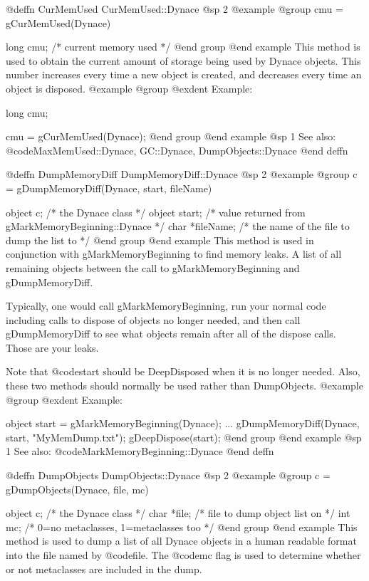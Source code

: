 @deffn {CurMemUsed} CurMemUsed::Dynace
@sp 2
@example
@group
cmu = gCurMemUsed(Dynace)

long    cmu;    /*  current memory used  */
@end group
@end example
This method is used to obtain the current amount of storage being used
by Dynace objects.  This number increases every time a new object is
created, and decreases every time an object is disposed.
@example
@group
@exdent Example:

long    cmu;

cmu = gCurMemUsed(Dynace);
@end group
@end example
@sp 1
See also:  @code{MaxMemUsed::Dynace, GC::Dynace, DumpObjects::Dynace}
@end deffn










@deffn {DumpMemoryDiff} DumpMemoryDiff::Dynace
@sp 2
@example
@group
c = gDumpMemoryDiff(Dynace, start, fileName)

object  c;       /*  the Dynace class  */
object start;    /*  value returned from gMarkMemoryBeginning::Dynace  */
char *fileName;  /*  the name of the file to dump the list to   */
@end group
@end example
This method is used in conjunction with gMarkMemoryBeginning to find
memory leaks.  A list of all remaining objects between the call
to gMarkMemoryBeginning and gDumpMemoryDiff.

Typically, one would call gMarkMemoryBeginning, run your normal code
including calls to dispose of objects no longer needed, and then
call gDumpMemoryDiff to see what objects remain after all of the 
dispose calls.  Those are your leaks.

Note that @code{start} should be DeepDisposed when it is no longer needed.
Also, these two methods should normally be used rather than DumpObjects.
@example
@group
@exdent Example:

object start = gMarkMemoryBeginning(Dynace);
...
gDumpMemoryDiff(Dynace, start, "MyMemDump.txt");
gDeepDispose(start);
@end group
@end example
@sp 1
See also:  @code{MarkMemoryBeginning::Dynace}
@end deffn








@deffn {DumpObjects} DumpObjects::Dynace
@sp 2
@example
@group
c = gDumpObjects(Dynace, file, mc)

object  c;      /*  the Dynace class  */
char    *file;  /*  file to dump object list on  */
int     mc;     /*  0=no metaclasses, 1=metaclasses too  */
@end group
@end example
This method is used to dump a list of all Dynace objects in a human
readable format into the file named by @code{file}.  The @code{mc}
flag is used to determine whether or not metaclasses are included
in the dump.

